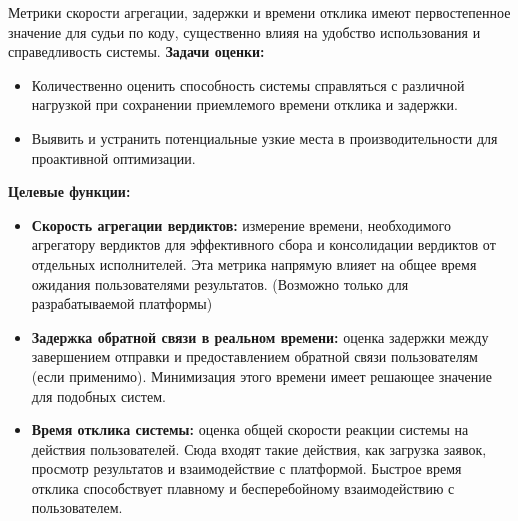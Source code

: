 

Метрики скорости агрегации, задержки и времени отклика имеют первостепенное значение для судьи по коду, существенно влияя на удобство использования и справедливость системы.
\noindent
\textbf{Задачи оценки:}
\noindent
\begin{itemize}
    \itemsep 0em
    \item Количественно оценить способность системы справляться с различной нагрузкой при сохранении приемлемого времени отклика и задержки.
    \item Выявить и устранить потенциальные узкие места в производительности для проактивной оптимизации.
\end{itemize}

\noindent
\textbf{Целевые функции:}
\noindent
\begin{itemize}
    \itemsep 0em
    \item \textbf{Скорость агрегации вердиктов:} измерение времени, необходимого агрегатору вердиктов для эффективного сбора и консолидации вердиктов от отдельных исполнителей. Эта метрика напрямую влияет на общее время ожидания пользователями результатов. (Возможно только для разрабатываемой платформы)
    \item \textbf{Задержка обратной связи в реальном времени:} оценка задержки между завершением отправки и предоставлением обратной связи пользователям (если применимо). Минимизация этого времени имеет решающее значение для подобных систем.
    \item \textbf{Время отклика системы:} оценка общей скорости реакции системы на действия пользователей. Сюда входят такие действия, как загрузка заявок, просмотр результатов и взаимодействие с платформой. Быстрое время отклика способствует плавному и бесперебойному взаимодействию с пользователем.
\end{itemize}
\noindent

